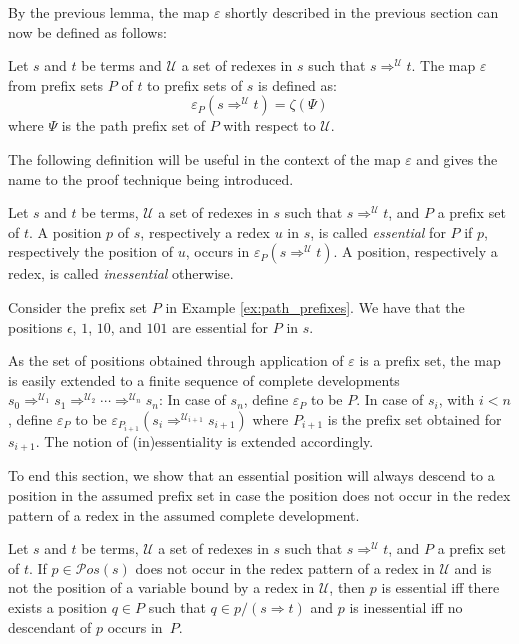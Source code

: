 \documentclass{LMCS}
\theoremstyle{definition}
\newcommand{\pos}[1]{\mathcal{P}os(#1)}
\newcommand{\dev}{\Rightarrow}
\newcommand{\pmap}{\varepsilon}
\newcommand{\pmaph}[1]{\pmap_{#1}}
\newcommand{\pmapp}[2]{\pmap_{#1}({#2})}
\begin{document}
By the previous lemma, the map $\pmap$ shortly described in the previous section can now be defined as follows:
\begin{defi}
\label{def:pmap}
Let $s$ and $t$ be terms and $\mathcal{U}$ a set of redexes in $s$ such that $s \dev^\mathcal{U} t$. The map $\pmap$ from prefix sets $P$ of $t$ to prefix sets of $s$ is defined as:
\[
\pmapp{P}{s \dev^\mathcal{U} t} = \zeta(\Psi)
\]
where $\Psi$ is the path prefix set of $P$ with respect to $\mathcal{U}$.
\end{defi}

The following definition will be useful in the context of the map $\pmap$ and gives the name to the proof technique being introduced.
\begin{defi}
\label{def:essential}
Let $s$ and $t$ be terms, $\mathcal{U}$ a set of redexes in $s$ such that $s \dev^\mathcal{U} t$, and $P$ a prefix set of $t$. A position $p$ of  $s$, respectively a redex $u$ in $s$, is called \emph{essential} for $P$ if $p$, respectively the position of $u$, occurs in $\pmapp{P}{s \dev^\mathcal{U} t}$. A position, respectively a redex, is called \emph{inessential} otherwise.
\end{defi}

\begin{exa}
Consider the prefix set $P$ in Example \ref{ex:path_prefixes}. We have that the positions $\epsilon$, $1$, $10$, and $101$ are essential for $P$ in $s$.
\end{exa}

As the set of positions obtained through application of $\pmap$ is a prefix set, the map is easily extended to a finite sequence of complete developments $s_0 \dev^{\mathcal{U}_1} s_1 \dev^{\mathcal{U}_2} \cdots \dev^{\mathcal{U}_n} s_n$: In case of $s_n$, define $\pmaph{P}$ to be $P$. In case of $s_i$, with $i < n$, define $\pmaph{P}$ to be $\pmapp{P_{i + 1}}{s_i \dev^{\mathcal{U}_{i + 1}} s_{i + 1}}$ where $P_{i + 1}$ is the prefix set obtained for $s_{i + 1}$. The notion of (in)essentiality is extended accordingly.

To end this section, we show that an essential position will always descend to a position in the assumed prefix set in case the position does not occur in the redex pattern of a redex in the assumed complete development.
\begin{prop}
\label{prop:desess}
Let $s$ and $t$ be terms, $\mathcal{U}$ a set of redexes in $s$ such that $s \dev^\mathcal{U} t$, and $P$ a prefix set of $t$. If $p \in \pos{s}$ does not occur in the redex pattern of a redex in $\mathcal{U}$ and is not the position of a variable bound by a redex in $\mathcal{U}$, then $p$ is essential if{f} there exists a position $q \in P$ such that $q \in p/(s \dev t)$ and $p$ is inessential if{f} no descendant of $p$ occurs in~$P$.
\end{prop}
\end{document}
